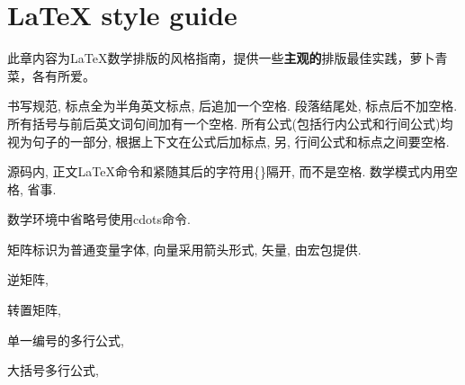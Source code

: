 \chapter{\LaTeX{} style guide}

此章内容为\LaTeX{}数学排版的风格指南，提供一些\textbf{主观的}排版最佳实践，萝卜青菜，各有所爱。

书写规范, 标点全为半角英文标点, 后追加一个空格. 段落结尾处, 标点后不加空格. 所有括号与前后英文词句间加有一个空格. 所有公式(包括行内公式和行间公式)均视为句子的一部分, 根据上下文在公式后加标点, 另, 行间公式和标点之间要空格.

源码内, 正文\LaTeX{}命令和紧随其后的字符用\{\}隔开, 而不是空格. 数学模式内用空格, 省事.

数学环境中省略号使用cdots命令.

矩阵标识为普通变量字体, 向量采用箭头形式, 矢量, 由宏包提供.

逆矩阵,

转置矩阵,

单一编号的多行公式,

大括号多行公式,


